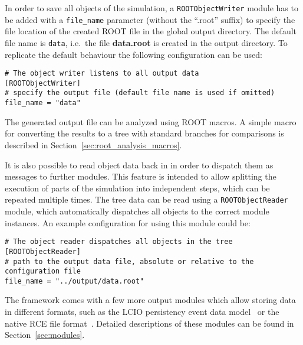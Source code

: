 In order to save all objects of the simulation, a \texttt{ROOTObjectWriter} module has to be added with a \texttt{file\_name} parameter (without the ``.root'' suffix) to specify the file location of the created ROOT file in the global output directory.
The default file name is \texttt{data}, i.e.\ the file \textbf{data.root} is created in the output directory.
To replicate the default behaviour the following configuration can be used:
\begin{verbatim}
# The object writer listens to all output data
[ROOTObjectWriter]
# specify the output file (default file name is used if omitted)
file_name = "data"
\end{verbatim}
The generated output file can be analyzed using ROOT macros.
A simple macro for converting the results to a tree with standard branches for comparisons is described in Section~\ref{sec:root_analysis_macros}.

It is also possible to read object data back in in order to dispatch them as messages to further modules.
This feature is intended to allow splitting the execution of parts of the simulation into independent steps, which can be repeated multiple times.
The tree data can be read using a \texttt{ROOTObjectReader} module, which automatically dispatches all objects to the correct module instances.
An example configuration for using this module could be:
\begin{verbatim}
# The object reader dispatches all objects in the tree
[ROOTObjectReader]
# path to the output data file, absolute or relative to the configuration file
file_name = "../output/data.root"
\end{verbatim}

The \apsq framework comes with a few more output modules which allow storing data in different formats, such as the LCIO persistency event data model~\cite{lcio} or the native RCE file format~\cite{rce}.
Detailed descriptions of these modules can be found in Section~\ref{sec:modules}.
